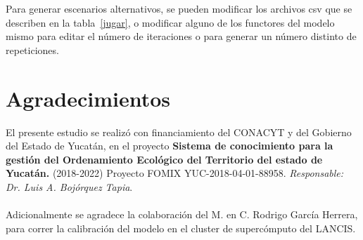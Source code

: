 \documentclass[12pt,a4paper,oldfontcommands]{article}
\begin{document}
\bigskip
Para generar escenarios alternativos, se pueden modificar los archivos csv que se describen en la tabla~\ref{jugar}, o modificar alguno de los functores del modelo mismo para editar el número de iteraciones o para generar un número distinto de repeticiones. \\
 
\pagebreak
\linebreak
\newpage
\section*{Agradecimientos}
El presente estudio se realizó con financiamiento del CONACYT y del Gobierno del Estado de Yucatán, en el proyecto \textbf{Sistema de conocimiento para la gestión del Ordenamiento Ecológico del Territorio del estado de Yucatán.} (2018-2022) Proyecto FOMIX YUC-2018-04-01-88958. \textit{Responsable: Dr. Luis A. Bojórquez Tapia}. \\
\bigskip \\
Adicionalmente se agradece la colaboración del M. en C. Rodrigo García Herrera, para correr la calibración del modelo en el cluster de supercómputo del LANCIS.
 \\
\bigskip


\printbibliography
\end{document}
